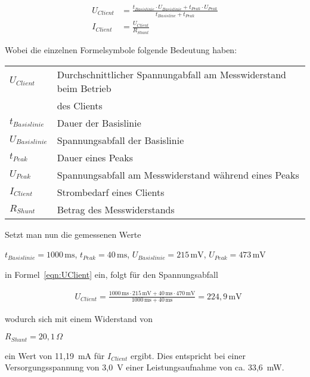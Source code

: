 \begin{align}
    U_{Client} &= \frac{t_{Basislinie} \cdot U_{Basislinie} + t_{Peak} \cdot U_{Peak}}{t_{Basisline} + t_{Peak}}
   \label{eqn:UClient}\\
    I_{Client} &= \frac{U_{Client}}{R_{Shunt}}
    \label{eqn:IClient}
\end{align}

Wobei die einzelnen Formelsymbole folgende Bedeutung haben:

\begin{tabular}{ll}
$U_{Client}     $ & Durchschnittlicher Spannungabfall am Messwiderstand beim Betrieb \\&des Clients\\
$t_{Basislinie} $ & Dauer der Basislinie \\
$U_{Basislinie} $ & Spannungsabfall der Basislinie \\
$t_{Peak}       $ & Dauer eines Peaks\\ 
$U_{Peak}       $ & Spannungsabfall am Messwiderstand während eines Peaks \\
$I_{Client}     $ & Strombedarf eines Clients \\
$R_{Shunt}      $ & Betrag des Messwiderstands\\
\end{tabular}

Setzt man nun die gemessenen Werte 

\begin{center}
    $t_{Basislinie} = 1000\,\text{ms}$,\quad
    $t_{Peak}       = 40\,\text{ms}$,\quad
    $U_{Basislinie} = 215\,\text{mV}$,\quad
    $U_{Peak}       = 473\,\text{mV}$
\end{center}

in Formel~\ref{eqn:UClient} ein, folgt für den Spannungsabfall

\begin{align*}
    &U_{Client} = \frac{1000\,\text{ms} \cdot 215\,\text{mV} + 40\,\text{ms} \cdot 470\,\text{mV}}{1000\,\text{ms} + 40\,\text{ms}} = 224,9\,\text{mV}
\end{align*}

wodurch sich mit einem Widerstand von 

\begin{center}$
    R_{Shunt} = 20,1\,\Omega
    $
\end{center}

ein Wert von 11,19~mA für $I_{Client}$ ergibt. Dies entspricht bei einer Versorgungsspannung von 3,0~V einer Leistungsaufnahme
von ca. 33,6~mW.

